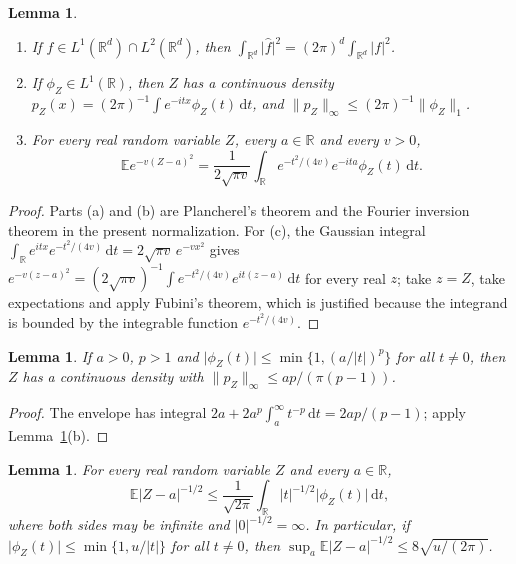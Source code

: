 \documentclass[11pt]{amsart}
\numberwithin{equation}{section}
\newtheorem{lemma}[theorem]{Lemma}
\theoremstyle{definition}
\theoremstyle{remark}
\newcommand{\R}{\mathbb R}
\newcommand{\E}{\mathbb E}
\newcommand{\1}{\mathbf 1}
\newcommand{\dd}{\,\mathrm d}
\newcommand{\norm}[1]{\lVert #1\rVert}
\newcommand{\abs}[1]{\lvert #1\rvert}
\begin{document}
\begin{lemma}\label{lem:fourier}
\begin{enumerate}
\item[(a)] If $f\in L^1(\R^d)\cap L^2(\R^d)$, then $\int_{\R^d}\abs{\widehat f}^2=(2\pi)^d\int_{\R^d}\abs f^2$.
\item[(b)] If $\phi_Z\in L^1(\R)$, then $Z$ has a continuous density $p_Z(x)=(2\pi)^{-1}\int e^{-itx}\phi_Z(t)\dd t$, and $\norm{p_Z}_\infty\le(2\pi)^{-1}\norm{\phi_Z}_1$.
\item[(c)] For every real random variable $Z$, every $a\in\R$ and every $v>0$,
\[
\E e^{-v(Z-a)^2}=\frac1{2\sqrt{\pi v}}\int_\R e^{-t^2/(4v)}e^{-ita}\phi_Z(t)\dd t.
\]
\end{enumerate}
\end{lemma}

\begin{proof}
Parts (a) and (b) are Plancherel's theorem and the Fourier inversion theorem in the present normalization. For (c), the Gaussian integral $\int_\R e^{itx}e^{-t^2/(4v)}\dd t=2\sqrt{\pi v}\,e^{-vx^2}$ gives $e^{-v(z-a)^2}=(2\sqrt{\pi v})^{-1}\int e^{-t^2/(4v)}e^{it(z-a)}\dd t$ for every real $z$; take $z=Z$, take expectations and apply Fubini's theorem, which is justified because the integrand is bounded by the integrable function $e^{-t^2/(4v)}$.
\end{proof}

\begin{lemma}\label{lem:envelope}
If $a>0$, $p>1$ and $\abs{\phi_Z(t)}\le\min\{1,(a/\abs t)^p\}$ for all $t\ne0$, then $Z$ has a continuous density with $\norm{p_Z}_\infty\le ap/(\pi(p-1))$.
\end{lemma}

\begin{proof}
The envelope has integral $2a+2a^p\int_a^\infty t^{-p}\dd t=2ap/(p-1)$; apply Lemma~\ref{lem:fourier}(b).
\end{proof}

\begin{lemma}\label{lem:halfmoment}
For every real random variable $Z$ and every $a\in\R$,
\begin{equation}\label{eq:halfmoment}
\E\abs{Z-a}^{-1/2}\le\frac1{\sqrt{2\pi}}\int_\R\abs t^{-1/2}\abs{\phi_Z(t)}\dd t,
\end{equation}
where both sides may be infinite and $\abs0^{-1/2}=\infty$. In particular, if $\abs{\phi_Z(t)}\le\min\{1,u/\abs t\}$ for all $t\ne0$, then $\sup_a\E\abs{Z-a}^{-1/2}\le8\sqrt{u/(2\pi)}$.
\end{lemma}
\end{document}
